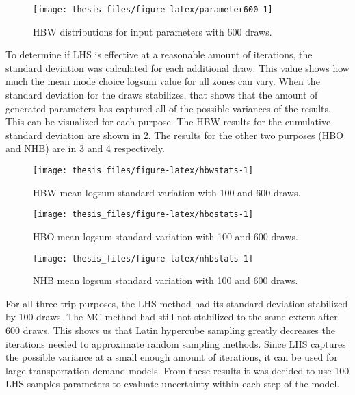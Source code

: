 \documentclass[fancy, masters,twoside]{byuthesis}
\begin{document}
\begin{figure}

{\centering \texttt{[image: thesis\_files/figure-latex/parameter600-1]} 

}

\caption{HBW distributions for input parameters with 600 draws.}\label{fig:parameter600}
\end{figure}

To determine if LHS is effective at a reasonable amount of iterations, the standard deviation was calculated for each additional draw. This value shows how much the mean mode choice logsum value for all zones can vary. When the standard deviation for the draws stabilizes, that shows that the amount of generated parameters has captured all of the possible variances of the results. This can be visualized for each purpose. The HBW results for the cumulative standard deviation are shown in \ref{fig:hbwstats}. The results for the other two purposes (HBO and NHB) are in \ref{fig:hbostats} and \ref{fig:nhbstats} respectively.

\begin{figure}

{\centering \texttt{[image: thesis\_files/figure-latex/hbwstats-1]} 

}

\caption{HBW mean logsum standard variation with 100 and 600 draws.}\label{fig:hbwstats}
\end{figure}

\begin{figure}

{\centering \texttt{[image: thesis\_files/figure-latex/hbostats-1]} 

}

\caption{HBO mean logsum standard variation with 100 and 600 draws.}\label{fig:hbostats}
\end{figure}

\begin{figure}

{\centering \texttt{[image: thesis\_files/figure-latex/nhbstats-1]} 

}

\caption{NHB mean logsum standard variation with 100 and 600 draws.}\label{fig:nhbstats}
\end{figure}

For all three trip purposes, the LHS method had its standard deviation stabilized by 100 draws. The MC method had still not stabilized to the same extent after 600 draws. This shows us that Latin hypercube sampling greatly decreases the iterations needed to approximate random sampling methods. Since LHS captures the possible variance at a small enough amount of iterations, it can be used for large transportation demand models. From these results it was decided to use 100 LHS samples parameters to evaluate uncertainty within each step of the model.
\end{document}
